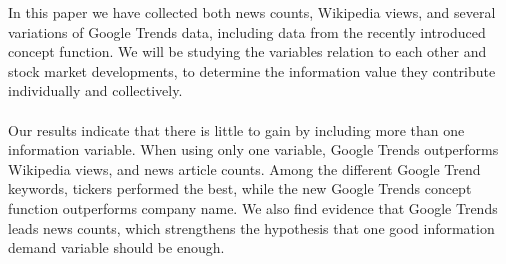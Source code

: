 In this paper we have collected both news counts, Wikipedia views, and several variations of Google Trends data, including data from the recently introduced concept function. We will be studying the variables relation to each other and stock market developments, to determine the information value they contribute individually and collectively.
\\\\
Our results indicate that there is little to gain by including more than one information variable. When using only one variable, Google Trends outperforms Wikipedia views, and news article counts. Among the different Google Trend keywords, tickers performed the best, while the new Google Trends concept function outperforms company name. We also find evidence that Google Trends leads news counts, which strengthens the hypothesis that one good information demand variable should be enough. 